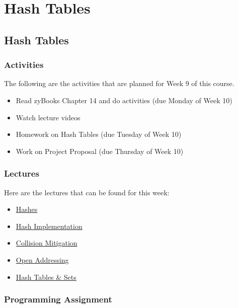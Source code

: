 \clearpage

\renewcommand{\ChapTitle}{Hash Tables}

\chapter{\ChapTitle}
\section{\ChapTitle}

\subsection{Activities}

The following are the activities that are planned for Week 9 of this course.

\begin{itemize}
    \item Read zyBooks Chapter 14 and do activities (due Monday of Week 10)
    \item Watch lecture videos
    \item Homework on Hash Tables (due Tuesday of Week 10)
    \item Work on Project Proposal (due Thursday of Week 10)
\end{itemize}

\subsection{Lectures}

Here are the lectures that can be found for this week:

\begin{itemize}
    \item \href{https://applied.cs.colorado.edu/mod/hvp/view.php?id=46014}{Hashes}
    \item \href{https://applied.cs.colorado.edu/mod/hvp/view.php?id=46015}{Hash Implementation}
    \item \href{https://applied.cs.colorado.edu/mod/hvp/view.php?id=46016}{Collision Mitigation}
    \item \href{https://applied.cs.colorado.edu/mod/hvp/view.php?id=46017}{Open Addressing}
    \item \href{https://applied.cs.colorado.edu/mod/hvp/view.php?id=46018}{Hash Tables \& Sets}
\end{itemize}

\subsection{Programming Assignment}

